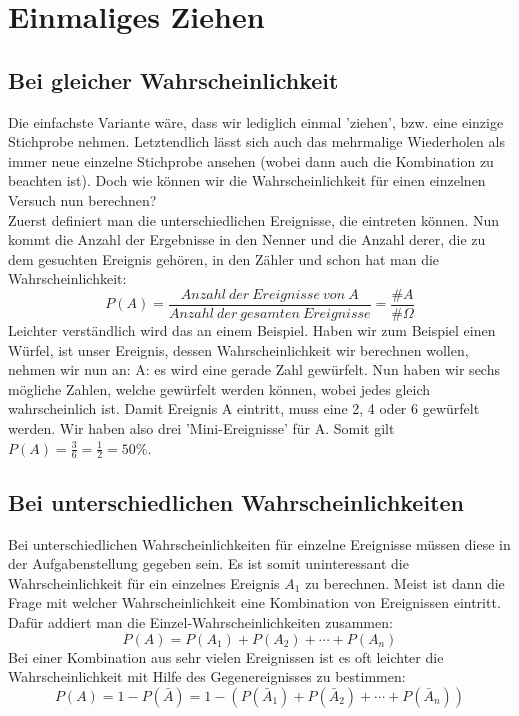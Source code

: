 \section{Einmaliges Ziehen}
\subsection{Bei gleicher Wahrscheinlichkeit}
Die einfachste Variante wäre, dass wir lediglich einmal 'ziehen', bzw. eine einzige Stichprobe nehmen. Letztendlich lässt sich auch das mehrmalige Wiederholen als immer neue einzelne Stichprobe ansehen (wobei dann auch die Kombination zu beachten ist). Doch wie können wir die Wahrscheinlichkeit für einen einzelnen Versuch nun berechnen?\\
Zuerst definiert man die unterschiedlichen Ereignisse, die eintreten können. Nun kommt die Anzahl der Ergebnisse in den Nenner und die Anzahl derer, die zu dem gesuchten Ereignis gehören, in den Zähler und schon hat man die Wahrscheinlichkeit:
\[P(A)=\frac{Anzahl\ der\ Ereignisse\ von\ A}{Anzahl\ der\ gesamten\ Ereignisse}=\frac{\#A}{\#\Omega}\]
Leichter verständlich wird das an einem Beispiel. Haben wir zum Beispiel einen Würfel, ist unser Ereignis, dessen Wahrscheinlichkeit wir berechnen wollen, nehmen wir nun an: A: es wird eine gerade Zahl gewürfelt. Nun haben wir sechs mögliche Zahlen, welche gewürfelt werden können, wobei jedes gleich wahrscheinlich ist. Damit Ereignis A eintritt, muss eine 2, 4 oder 6 gewürfelt werden. Wir haben also drei 'Mini-Ereignisse' für A. Somit gilt \(P(A)=\frac{3}{6}=\frac{1}{2}=50\%\).
\subsection{Bei unterschiedlichen Wahrscheinlichkeiten}
Bei unterschiedlichen Wahrscheinlichkeiten für einzelne Ereignisse müssen diese in der Aufgabenstellung gegeben sein. Es ist somit uninteressant die Wahrscheinlichkeit für ein einzelnes Ereignis $A_1$ zu berechnen. Meist ist dann die Frage mit welcher Wahrscheinlichkeit eine Kombination von Ereignissen eintritt. Dafür addiert man die Einzel-Wahrscheinlichkeiten zusammen:
\[P(A)=P(A_1)+P(A_2)+\cdots+P(A_n)\]
Bei einer Kombination aus sehr vielen Ereignissen ist es oft leichter die Wahrscheinlichkeit mit Hilfe des Gegenereignisses zu bestimmen:
\[P(A)=1-P(\bar{A})=1-(P(\bar{A}_1)+P(\bar{A}_2)+\cdots+P(\bar{A}_n))\]
